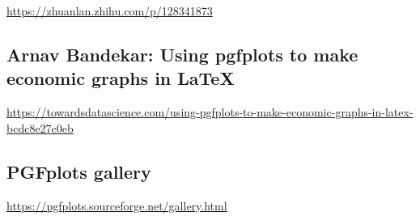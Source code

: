 \documentclass[
]{book}
\theoremstyle{definition}
\theoremstyle{definition}
\theoremstyle{definition}
\theoremstyle{definition}
\theoremstyle{remark}
\begin{document}
\url{https://zhuanlan.zhihu.com/p/128341873}

\subsection{Arnav Bandekar: Using pgfplots to make economic graphs in LaTeX}\label{arnav-bandekar-using-pgfplots-to-make-economic-graphs-in-latex}

\url{https://towardsdatascience.com/using-pgfplots-to-make-economic-graphs-in-latex-bcdc8e27c0eb}

\subsection{PGFplots gallery}\label{pgfplots-gallery}

\url{https://pgfplots.sourceforge.net/gallery.html}
\end{document}
